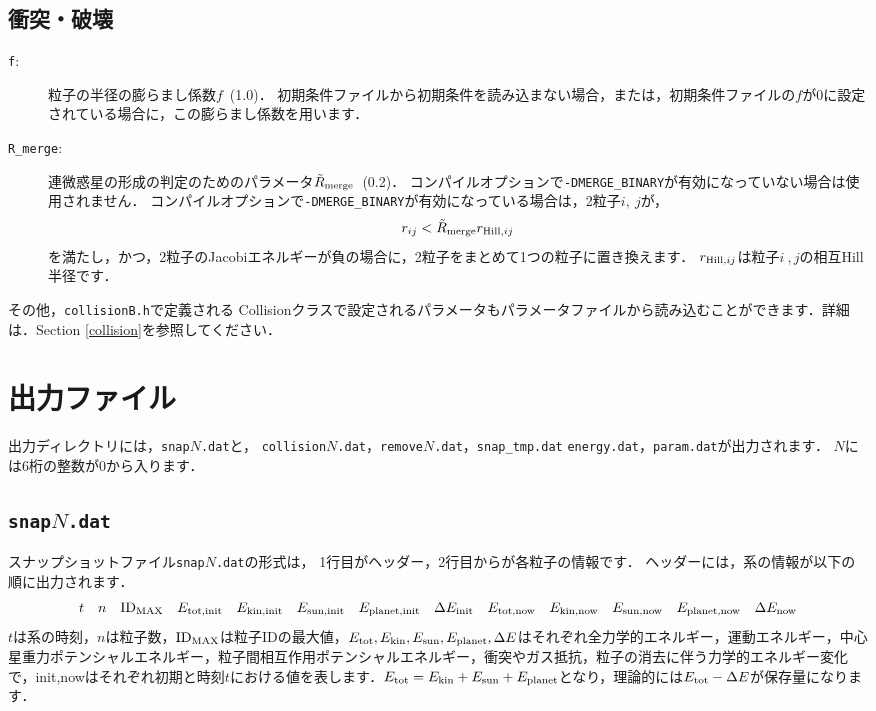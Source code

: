 \documentclass[12pt,a4paper,dvipdfmx]{jsarticle}
\begin{document}
\subsection{衝突・破壊}
\begin{description}
\item[\texttt{f}:]
粒子の半径の膨らまし係数$f$\ (1.0)．
初期条件ファイルから初期条件を読み込まない場合，または，初期条件ファイルの$f$が0に設定されている場合に，この膨らまし係数を用います．
\item[\texttt{R\_merge}:]
連微惑星の形成の判定のためのパラメータ$\tilde{R}_{\rm merge}$\ (0.2)．
コンパイルオプションで\texttt{-DMERGE\_BINARY}が有効になっていない場合は使用されません．
コンパイルオプションで\texttt{-DMERGE\_BINARY}が有効になっている場合は，2粒子$i,\ j$が，
\begin{equation}
r_{ij} < \tilde{R}_{\rm merge}r_{{\rm Hill},ij}
\end{equation}
を満たし，かつ，2粒子のJacobiエネルギーが負の場合に，2粒子をまとめて1つの粒子に置き換えます．
$r_{{\rm Hill},ij}$は粒子$i\ ,j$の相互Hill半径です．
\end{description}

その他，\texttt{collisionB.h}で定義される Collisionクラスで設定されるパラメータもパラメータファイルから読み込むことができます．詳細は．Section \ref{collision}を参照してください．


\section{出力ファイル\label{output}}

出力ディレクトリには，\texttt{snap}$N$\texttt{.dat}と，
\texttt{collision}$N$\texttt{.dat}，\texttt{remove}$N$\texttt{.dat}，\texttt{snap\_tmp.dat}
\texttt{energy.dat}，\texttt{param.dat}が出力されます．
$N$には6桁の整数が0から入ります．

\subsection{\texttt{snap}$N$\texttt{.dat}\label{snap}}
スナップショットファイル\texttt{snap}$N$\texttt{.dat}の形式は，
1行目がヘッダー，2行目からが各粒子の情報です．
ヘッダーには，系の情報が以下の順に出力されます．
\[
t\quad n\quad {\rm ID}_{\rm MAX}\quad E_{\rm tot,init}\quad E_{\rm kin,init}\quad E_{\rm sun,init}\quad E_{\rm planet,init}\quad \Delta E_{\rm init}
\quad E_{\rm tot,now}\quad E_{\rm kin,now}\quad E_{\rm sun,now}\quad E_{\rm planet,now}\quad \Delta E_{\rm now}
\]
$t$は系の時刻，$n$は粒子数，${\rm ID}_{\rm MAX}$は粒子IDの最大値，$E_{\rm tot},E_{\rm kin},E_{\rm sun}, E_{\rm planet},\Delta E$はそれぞれ全力学的エネルギー，運動エネルギー，中心星重力ポテンシャルエネルギー，粒子間相互作用ポテンシャルエネルギー，衝突やガス抵抗，粒子の消去に伴う力学的エネルギー変化で，init,nowはそれぞれ初期と時刻$t$における値を表します．$E_{\rm tot} = E_{\rm kin} + E_{\rm sun} + E_{\rm planet}$となり，理論的には$E_{\rm tot}-\Delta E$が保存量になります．
\end{document}
